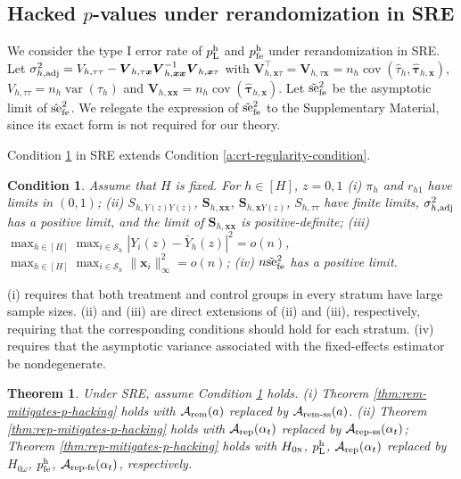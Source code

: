 \documentclass[12pt]{article}
\newtheorem{theorem}{Theorem}
\newtheorem{condition}{Condition}
\newcommand{\hpfe}{p_\textnormal{fe}^{\textnormal{h}}}
\newcommand{\se}{\textnormal{se}}
\newcommand{\cov}{\operatorname{cov}}
\newcommand{\adj}{\textnormal{adj}}
\newcommand{\var}{\operatorname{var}}
\newcommand{\ma}{\mathcal{A}}
\newcommand{\ms}{\mathcal{S}}
\newcommand{\rem}{\textnormal{rem}}
\newcommand{\remss}{\textnormal{rem-ss}}
\newcommand{\repss}{\textnormal{rep-ss}}
\newcommand{\repfe}{\textnormal{rep-fe}}
\newcommand{\rep}{\textnormal{rep}}
\newcommand{\fe}{\textnormal{fe}}
\newcommand{\bs}{\boldsymbol}
\newcommand{\hpL}{p_\textnormal{L}^{\textnormal{h}}}
\newcommand{\lx}[1]{#1}
\begin{document}
\subsection{Hacked $p$-values under rerandomization in SRE}

We consider the type I error rate of $\hpL$ and $\hpfe$ under rerandomization in SRE. Let $\sigma^2_{h,\adj} = V_{h,\tau\tau}- \bs{V}_{h,\tau \bs{x}} \bs{V}_{h,\bs{x}\bs{x}}^{-1} \bs{V}_{h,\bs{x}\tau}$ with $\bs{V}_{ h,  \bs{x}\tau}^\top = \bs{V}_{ h,  \tau\bs{x}} = n_{ h }\cov(\hat{\tau}_{h},\hat{\bs{\tau}}_{h,\bs{x}})$, $V_{h,\tau\tau} = n_{ h }\var(\hat{\tau}_{h})$ and $\bs{V}_{h,\bs{x}\bs{x}} = n_{ h }\cov(\hat{\bs{\tau}}_{h, \bs{x}})$. Let $\tilde{\se}^2_{\fe }$ be the asymptotic limit of $\hat{\se}_{\fe}^2$. We relegate the expression of $\tilde{\se}^2_{\fe }$ to the Supplementary Material, since its exact form is not required for our theory.

 Condition \ref{a:CLT-sre-for-rerandomization} in SRE extends Condition \ref{a:crt-regularity-condition}.

\begin{condition}
\label{a:CLT-sre-for-rerandomization}
 Assume that $H$ is fixed. For $h \in [H]$, $z=0,1$ (i) $\pi_h$ and $r_{h1}$ have limits in $(0,1)$; (ii)  $S_{h,Y(z)Y(z)}$,  $\bs{S}_{h,\bs{x}\bs{x}}$, $\bs{S}_{h,\bs{x} Y(z)}$, $S_{h,\tau\tau}$ have finite limits, $\sigma^2_{h,\adj}$ has a positive limit, and the limit of $\bs{S}_{h,\bs{x}\bs{x}}$ is positive-definite; (iii) $\max_{h\in[H]}\max_{i\in \ms_h} |Y_i(z)-\bar{Y}_h(z)|^2 = o(n)$, $\max_{h\in[H]}\max_{i\in \ms_h} \lVert\bs{x}_i\lVert_{\infty}^2 = o(n)$; (iv) $n\tilde{\se}^2_{\fe }$ has a positive limit. 
\end{condition}

\lx{ (i) requires that both treatment and control groups in every stratum have large sample sizes. \Cref{a:CLT-sre-for-rerandomization} (ii) and (iii) are direct extensions of \Cref{a:crt-regularity-condition} (ii) and (iii), respectively, requiring that the corresponding conditions should hold for each stratum. \Cref{a:CLT-sre-for-rerandomization} (iv) requires that the asymptotic
variance associated with the fixed-effects estimator be nondegenerate.}

\begin{theorem}
\label{thm:re-mitigates-p-hacking-sre}
Under SRE, assume Condition \ref{a:CLT-sre-for-rerandomization} holds. (i) Theorem \ref{thm:rem-mitigates-p-hacking} holds with $\ma_{\rem}(a)$ replaced by $\ma_{\remss}(a)$. (ii) Theorem \ref{thm:rep-mitigates-p-hacking} holds with $\ma_{\rep}(\alpha_t)$ replaced by $\ma_{\repss}(\alpha_t)$; Theorem \ref{thm:rep-mitigates-p-hacking} holds with $H_{0\textsc{n}}$, $\hpL$, $\ma_{\rep}(\alpha_t)$ replaced by $H_{0\omega}$, $\hpfe$, $\ma_{\repfe}(\alpha_t)$, respectively.
\end{theorem}
\end{document}
